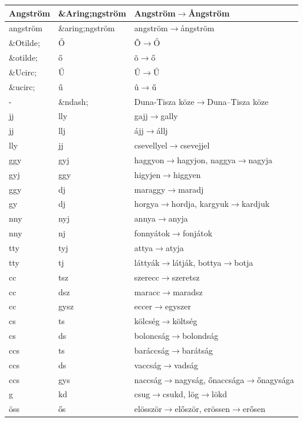 \begin{longtable}[l]{llp{10cm}}
\\ \hline Angström& \&Aring;ngström & Angström$\rightarrow$\AA ngström
\\ \hline angström& \&aring;ngström & angström$\rightarrow$\aa ngström
\\ \hline \&Otilde;& Ő & \~O$\rightarrow$Ő
\\ \hline \&otilde;& ő & \~o$\rightarrow$ő
\\ \hline \&Ucirc;& Ű & \^U$\rightarrow$Ű
\\ \hline \&ucirc;& ű & \^u$\rightarrow$ű
\\ \hline - & \&ndash; & Duna-Tisza köze$\rightarrow$Duna--Tisza köze
\\ \hline jj & lly & gajj$\rightarrow$gally
\\ \hline jj & llj & ájj$\rightarrow$állj
\\ \hline lly & jj & csevellyel$\rightarrow$csevejjel
\\ \hline ggy & gyj & haggyon$\rightarrow$hagyjon, naggya$\rightarrow$nagyja
\\ \hline gyj & ggy & higyjen$\rightarrow$higgyen
\\ \hline ggy & dj & maraggy$\rightarrow$maradj
\\ \hline gy & dj & horgya$\rightarrow$hordja, kargyuk$\rightarrow$kardjuk
\\ \hline nny & nyj & annya$\rightarrow$anyja
\\ \hline nny & nj & fonnyátok$\rightarrow$fonjátok
\\ \hline tty & tyj & attya$\rightarrow$atyja
\\ \hline tty & tj & láttyák$\rightarrow$látják, bottya$\rightarrow$botja
\\ \hline cc & tsz & szerecc$\rightarrow$szeretsz
\\ \hline cc & dsz & maracc$\rightarrow$maradsz
\\ \hline cc & gysz & eccer$\rightarrow$egyszer
\\ \hline cs & ts & kölcség$\rightarrow$költség
\\ \hline cs & ds & boloncság$\rightarrow$bolondság
\\ \hline ccs & ts & baráccság$\rightarrow$barátság
\\ \hline ccs & ds & vaccság$\rightarrow$vadság
\\ \hline ccs & gys & naccság$\rightarrow$nagyság, őnaccsága$\rightarrow$őnagysága
\\ \hline g & kd & csug$\rightarrow$csukd, lög$\rightarrow$lökd
\\ \hline öss & ős & elösször$\rightarrow$először, erössen$\rightarrow$erősen

\end{longtable}
